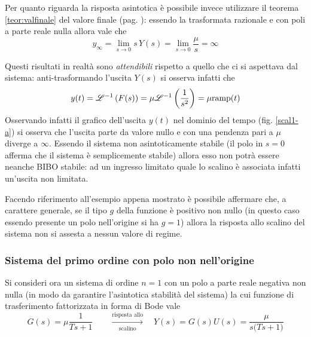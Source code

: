 			Per quanto riguarda la risposta asintotica è possibile invece utilizzare il teorema \ref{teor:valfinale} del valore finale (pag. \pageref{teor:valfinale}): essendo la trasformata razionale e con poli a parte reale nulla allora vale che
			\[ y_\infty = \lim_{s\rightarrow 0} s\,Y(s) = \lim_{s\rightarrow 0} \frac \mu s = \infty \]
			
			Questi risultati in realtà sono \textit{attendibili} rispetto a quello che ci si aspettava dal sistema: anti-trasformando l'uscita $Y(s)$ si osserva infatti che
			\[ y(t) = \mathscr {L}^{-1} \left( F(s) \right) = \mu \mathscr {L}^{-1} \left( \frac 1 {s^2} \right) = \mu \textrm{ramp}(t) \]
			Osservando infatti il grafico dell'uscita $y(t)$ nel dominio del tempo (fig. \ref{scal1-a}) si osserva che l'uscita parte da valore nullo e con una pendenza pari a $\mu$ diverge a $\infty$. Essendo il sistema non asintoticamente stabile (il polo in $s=0$ afferma che il sistema è semplicemente stabile) allora esso non potrà essere neanche BIBO stabile: ad un ingresso limitato quale lo scalino è associata infatti un'uscita non limitata.
			
	
			\begin{concetto}
				Facendo riferimento all'esempio appena mostrato è possibile affermare che, a carattere generale, se il tipo $g$ della funzione è positivo non nullo (in questo caso essendo presente un polo nell'origine si ha $g=1$) allora la risposta allo scalino del sistema non si assesta a nessun valore di regime.
			\end{concetto}
	
		\subsubsection{Sistema del primo ordine con polo non nell'origine}
			Si consideri ora un sistema di ordine $n=1$ con un polo a parte reale negativa non nulla (in modo da garantire l'asintotica stabilità del sistema) la cui funzione di trasferimento fattorizzata in forma di Bode vale
			\[ G(s) = \mu \frac 1{Ts + 1} \qquad \xrightarrow[\textrm{scalino}]{\textrm{risposta allo}} \quad Y(s) = G(s) U(s) =  \frac \mu {s\big(Ts + 1\big)} \]
			
